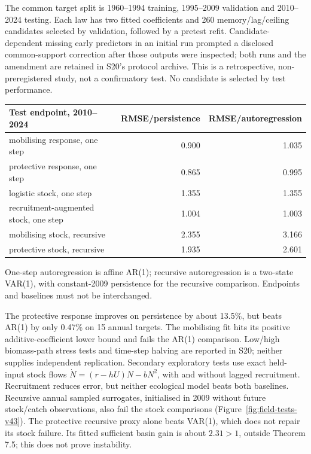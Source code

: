 The common target split is 1960--1994 training, 1995--2009 validation
and 2010--2024 testing. Each law has two fitted coefficients and 260
memory/lag/ceiling candidates selected by validation, followed by a
pretest refit. Candidate-dependent missing early predictors in an initial
run prompted a disclosed common-support correction after those outputs
were inspected; both runs and the amendment are retained in S20's
protocol archive. This is a retrospective, non-preregistered study,
not a confirmatory test. No candidate is selected by test performance.
\begin{center}\small
\begin{tabular}{lrr}
\toprule Test endpoint, 2010--2024 & RMSE/persistence & RMSE/autoregression\\\midrule
mobilising response, one step & 0.900 & 1.035\\
protective response, one step & 0.865 & 0.995\\
logistic stock, one step & 1.355 & 1.355\\
recruitment-augmented stock, one step & 1.004 & 1.003\\
mobilising stock, recursive & 2.355 & 3.166\\
protective stock, recursive & 1.935 & 2.601\\\bottomrule
\end{tabular}
\end{center}
One-step autoregression is affine AR(1); recursive autoregression is a
two-state VAR(1), with constant-2009 persistence for the recursive
comparison. Endpoints and baselines must not be interchanged.

The protective response improves on persistence by about 13.5\%, but
beats AR(1) by only 0.47\% on 15 annual targets. The mobilising fit
hits its positive additive-coefficient lower bound and fails the AR(1)
comparison. Low/high biomass-path stress tests and time-step halving are
reported in S20; neither supplies independent replication. Secondary
exploratory tests use exact held-input stock flows
$\dot N=(r-hU)N-bN^2$, with and without lagged recruitment. Recruitment
reduces error, but neither ecological model beats both baselines.
Recursive annual sampled surrogates, initialised in 2009 without future
stock/catch observations, also fail the stock comparisons (Figure~\ref{fig:field-tests-v43}).
The protective recursive proxy alone beats VAR(1), which does not repair
its stock failure. Its fitted sufficient basin gain is about $2.31>1$,
outside Theorem 7.5; this does not prove instability.

